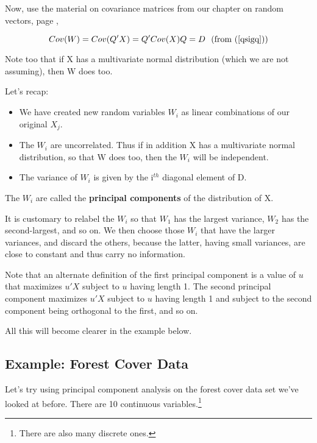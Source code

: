Now, use the material on covariance matrices from our chapter on
random vectors, page \pageref{covawaprime},

\begin{equation}
Cov(W) = Cov(Q'X) = Q' Cov(X) Q = D ~~ \textrm{(from (\ref{qsigq}))}
\end{equation}

Note too that if X has a multivariate normal distribution (which we are
not assuming), then W does too.

Let's recap:

\begin{itemize}

\item We have created new random variables $W_i$ as linear combinations
of our original $X_j$.

\item The $W_i$ are uncorrelated.  Thus if in addition X has a
multivariate normal distribution, so that W does too, then the $W_i$
will be independent.

\item The variance of $W_i$ is given by the i$^{th}$ diagonal element of
D.

\end{itemize}

The $W_i$ are called the {\bf principal components} of the distribution
of X.

It is customary to relabel the $W_i$ so that $W_1$ has the largest
variance, $W_2$ has the second-largest, and so on.  We then choose those
$W_i$ that have the larger variances, and discard the others, because
the latter, having small variances, are close to constant and thus carry
no information.  

Note that an alternate definition of the first principal component is a
value of $u$ that maximizes $u'X$ subject to $u$ having length 1.  The
second principal component maximizes  $u'X$ subject to $u$ having length
1 and subject to the second component being orthogonal to the first, and
so on.

All this will become clearer in the example below.

\subsection{Example:  Forest Cover Data}

Let's try using principal component analysis on the forest cover data
set we've looked at before.  There are 10 continuous
variables.\footnote{There are also many discrete ones.}

